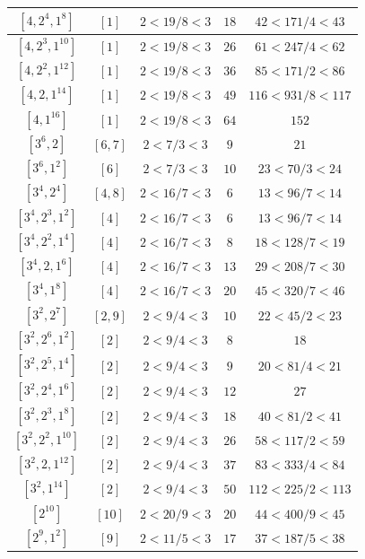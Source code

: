 \documentclass{article}%
\begin{document}
\begin{center}
\begin{longtable}{||c|c|c|c|c||}
$[4, 2^{4}, 1^{8}]$ & $[1]$ & $2 < 19/8 < 3$ & $18$ & $42 < 171/4 < 43$ \\ \hline 
$[4, 2^{3}, 1^{10}]$ & $[1]$ & $2 < 19/8 < 3$ & $26$ & $61 < 247/4 < 62$ \\ \hline 
$[4, 2^{2}, 1^{12}]$ & $[1]$ & $2 < 19/8 < 3$ & $36$ & $85 < 171/2 < 86$ \\ \hline 
$[4, 2, 1^{14}]$ & $[1]$ & $2 < 19/8 < 3$ & $49$ & $116 < 931/8 < 117$ \\ \hline 
$[4, 1^{16}]$ & $[1]$ & $2 < 19/8 < 3$ & $64$ & $152$ \\ \hline 
$[3^{6}, 2]$ & $[6, 7]$ & $2 < 7/3 < 3$ & $9$ & $21$ \\ \hline 
$[3^{6}, 1^{2}]$ & $[6]$ & $2 < 7/3 < 3$ & $10$ & $23 < 70/3 < 24$ \\ \hline 
$[3^{4}, 2^{4}]$ & $[4, 8]$ & $2 < 16/7 < 3$ & $6$ & $13 < 96/7 < 14$ \\ \hline 
$[3^{4}, 2^{3}, 1^{2}]$ & $[4]$ & $2 < 16/7 < 3$ & $6$ & $13 < 96/7 < 14$ \\ \hline 
$[3^{4}, 2^{2}, 1^{4}]$ & $[4]$ & $2 < 16/7 < 3$ & $8$ & $18 < 128/7 < 19$ \\ \hline 
$[3^{4}, 2, 1^{6}]$ & $[4]$ & $2 < 16/7 < 3$ & $13$ & $29 < 208/7 < 30$ \\ \hline 
$[3^{4}, 1^{8}]$ & $[4]$ & $2 < 16/7 < 3$ & $20$ & $45 < 320/7 < 46$ \\ \hline 
$[3^{2}, 2^{7}]$ & $[2, 9]$ & $2 < 9/4 < 3$ & $10$ & $22 < 45/2 < 23$ \\ \hline 
$[3^{2}, 2^{6}, 1^{2}]$ & $[2]$ & $2 < 9/4 < 3$ & $8$ & $18$ \\ \hline 
$[3^{2}, 2^{5}, 1^{4}]$ & $[2]$ & $2 < 9/4 < 3$ & $9$ & $20 < 81/4 < 21$ \\ \hline 
$[3^{2}, 2^{4}, 1^{6}]$ & $[2]$ & $2 < 9/4 < 3$ & $12$ & $27$ \\ \hline 
$[3^{2}, 2^{3}, 1^{8}]$ & $[2]$ & $2 < 9/4 < 3$ & $18$ & $40 < 81/2 < 41$ \\ \hline 
$[3^{2}, 2^{2}, 1^{10}]$ & $[2]$ & $2 < 9/4 < 3$ & $26$ & $58 < 117/2 < 59$ \\ \hline 
$[3^{2}, 2, 1^{12}]$ & $[2]$ & $2 < 9/4 < 3$ & $37$ & $83 < 333/4 < 84$ \\ \hline 
$[3^{2}, 1^{14}]$ & $[2]$ & $2 < 9/4 < 3$ & $50$ & $112 < 225/2 < 113$ \\ \hline 
$[2^{10}]$ & $[10]$ & $2 < 20/9 < 3$ & $20$ & $44 < 400/9 < 45$ \\ \hline 
$[2^{9}, 1^{2}]$ & $[9]$ & $2 < 11/5 < 3$ & $17$ & $37 < 187/5 < 38$ \\ \hline 

\end{longtable}
\end{center}
\end{document}
